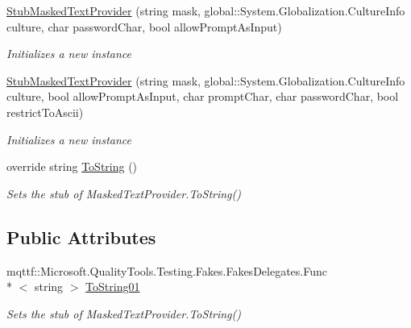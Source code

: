 \begin{DoxyCompactItemize}
\hyperlink{class_system_1_1_component_model_1_1_fakes_1_1_stub_masked_text_provider_a99d326f8d49419887e1f4af89b9f821d}{Stub\-Masked\-Text\-Provider} (string mask, global\-::\-System.\-Globalization.\-Culture\-Info culture, char password\-Char, bool allow\-Prompt\-As\-Input)
\begin{DoxyCompactList}\small\item\em Initializes a new instance\end{DoxyCompactList}\item 
\hyperlink{class_system_1_1_component_model_1_1_fakes_1_1_stub_masked_text_provider_a29d2a6085d80300d99874f8ba2128425}{Stub\-Masked\-Text\-Provider} (string mask, global\-::\-System.\-Globalization.\-Culture\-Info culture, bool allow\-Prompt\-As\-Input, char prompt\-Char, char password\-Char, bool restrict\-To\-Ascii)
\begin{DoxyCompactList}\small\item\em Initializes a new instance\end{DoxyCompactList}\item 
override string \hyperlink{class_system_1_1_component_model_1_1_fakes_1_1_stub_masked_text_provider_ae6dbd60490fc10a28b428d97225aedd5}{To\-String} ()
\begin{DoxyCompactList}\small\item\em Sets the stub of Masked\-Text\-Provider.\-To\-String()\end{DoxyCompactList}\end{DoxyCompactItemize}
\subsection*{Public Attributes}
\begin{DoxyCompactItemize}
\item 
mqttf\-::\-Microsoft.\-Quality\-Tools.\-Testing.\-Fakes.\-Fakes\-Delegates.\-Func\\*
$<$ string $>$ \hyperlink{class_system_1_1_component_model_1_1_fakes_1_1_stub_masked_text_provider_afaa646671df1b095ee4723a27d837351}{To\-String01}
\begin{DoxyCompactList}\small\item\em Sets the stub of Masked\-Text\-Provider.\-To\-String()\end{DoxyCompactList}\end{DoxyCompactItemize}
